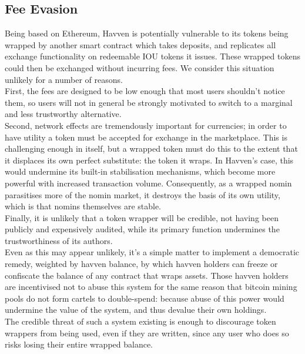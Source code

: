 \newpage

\subsection{Fee Evasion}

\noindent Being based on Ethereum, Havven is potentially vulnerable to its tokens being wrapped by another
smart contract which takes deposits, and replicates all exchange functionality on redeemable IOU tokens
it issues. These wrapped tokens could then be exchanged without incurring fees.
\noindent We consider this situation unlikely for a number of reasons. \\

\noindent First, the fees are designed to be low enough that most users
shouldn't notice them, so users will not in general be strongly motivated to switch
to a marginal and less trustworthy alternative. \\

\noindent Second, network effects are tremendously important for currencies; in order to have
utility a token must be accepted for exchange in the marketplace. This is challenging enough in itself, but a wrapped
token must do this to the extent that it displaces its own perfect substitute: the token it wraps.
\noindent In Havven's case, this would undermine its built-in stabilisation mechanisms, which become more powerful with
increased transaction volume. Consequently, as a wrapped nomin parasitises more of the nomin
market, it destroys the basis of its own utility, which is that nomins themselves are stable. \\

\noindent Finally, it is unlikely that a token wrapper will be credible, not having been publicly and expensively audited, while its primary function undermines the trustworthiness of its authors. \\

\noindent Even as this may appear unlikely, it's a simple matter to implement a democratic remedy, weighted by havven balance,
by which havven holders can freeze or confiscate the balance of any contract that wraps assets.
Those havven holders are incentivised not to abuse this system for the same reason that
bitcoin mining pools do not form cartels to double-spend: because abuse of this power
would undermine the value of the system, and thus devalue their own holdings. \\

\noindent The credible threat of such a system existing is enough to discourage token wrappers
from being used, even if they are written, since any user who does so risks losing their
entire wrapped balance.

\newpage
